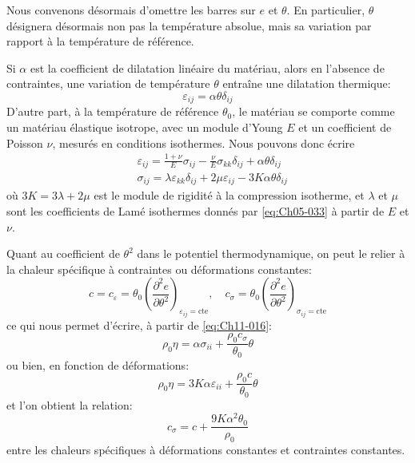 Nous convenons désormais d'omettre les barres sur $e$ et $\theta$.
En particulier, $\theta$ désignera désormais non pas la température absolue, mais sa variation par rapport à la température de référence. 

Si $\alpha$ est la coefficient de dilatation linéaire du matériau, alors en l'absence de contraintes, une variation de température $\theta$ entraîne une dilatation thermique: 
\begin{equation}
    \varepsilon_{ij} = \alpha \theta \delta_{ij}
    \label{eq:Ch11-019}
\end{equation}
D'autre part, à la température de référence $\theta_0$, le matériau se comporte comme un matériau élastique isotrope, avec un module d'Young $E$ et un coefficient de Poisson $\nu$, mesurés en conditions isothermes.
Nous pouvons donc écrire 
\begin{subequations}
\begin{align}
   & \varepsilon_{ij} = \frac{1+\nu}{E}\sigma_{ij} - \frac{\nu}{E}\sigma_{kk}\delta_{ij} + \alpha \theta \delta_{ij}
    \label{eq:Ch11-020}\\
   & \sigma_{ij} = \lambda \varepsilon_{kk} \delta_{ij} + 2 \mu \varepsilon_{ij} -3 K \alpha \theta \delta_{ij}
    \label{eq:Ch11-021}
\end{align}
\end{subequations}
où $ 3 K = 3 \lambda + 2 \mu $ est le module de rigidité à la compression isotherme, et $\lambda$ et $\mu$ sont les coefficients de Lamé isothermes donnés par \eqref{eq:Ch05-033} à partir de $E$ et $\nu$.

Quant au coefficient de $\theta^2$ dans le potentiel thermodynamique, on peut le relier à la chaleur spécifique à contraintes ou déformations constantes: 
\begin{equation}
    c = c_{\varepsilon} = \theta_0 \left(\frac{\partial^2 e}{\partial \theta^2}\right)_{\varepsilon_{ij}=\text{cte}}, \quad c_{\sigma} = \theta_0 \left(\frac{\partial^2 e}{\partial \theta^2}\right)_{\sigma_{ij}=\text{cte}}
    \label{eq:Ch11-022}
\end{equation}
ce qui nous permet d'écrire, à partir de \eqref{eq:Ch11-016}: 
\begin{equation}
    \rho_0\eta = \alpha \sigma_{ii} + \frac{\rho_0 c_{\sigma}}{\theta_0}\theta
    \label{eq:Ch11-023}
\end{equation}
ou bien, en fonction de déformations: 
\begin{equation}
    \rho_0\eta = 3 K \alpha \varepsilon_{ii} + \frac{\rho_0 c}{\theta_0}\theta
    \label{eq:Ch11-024}
\end{equation}
et l'on obtient la relation: 
\begin{equation}
    c_{\sigma} = c +\frac{9 K \alpha^2 \theta_0}{\rho_0}
    \label{eq:Ch11-025}
\end{equation}
entre les chaleurs spécifiques à déformations constantes et contraintes constantes. 


